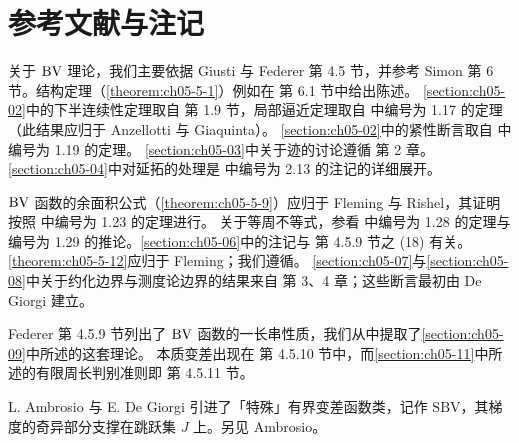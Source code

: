 \documentclass[../../main.tex]{subfiles}%
\begin{document}
\section{参考文献与注记}\label{section:ch05-12}

关于 $\mathrm{BV}$ 理论，我们主要依据 Giusti\cite{giusti1984} 与 Federer\cite{federer1969} 第 4.5 节，并参考 Simon\cite{simon1984} 第 6 节。结构定理（\cref{theorem:ch05-5-1}）例如在\cite{simon1984} 第 6.1 节中给出陈述。%
\cref{section:ch05-02}中的下半连续性定理取自\cite{giusti1984} 第 1.9 节，局部逼近定理取自\cite{giusti1984} 中编号为 1.17 的定理（此结果应归于 Anzellotti 与 Giaquinta）。%
\cref{section:ch05-02}中的紧性断言取自\cite{giusti1984} 中编号为 1.19 的定理。%
\cref{section:ch05-03}中关于迹的讨论遵循\cite{giusti1984} 第 2 章。%
\cref{section:ch05-04}中对延拓的处理是\cite{giusti1984} 中编号为 2.13 的注记的详细展开。%

$\mathrm{BV}$ 函数的余面积公式（\cref{theorem:ch05-5-9}）应归于 Fleming 与 Rishel\cite{fleming1960}，其证明按照\cite{giusti1984} 中编号为 1.23 的定理进行。%
关于等周不等式，参看\cite{giusti1984} 中编号为 1.28 的定理与编号为 1.29 的推论。\cref{section:ch05-06}中的注记与\cite{federer1969} 第 4.5.9 节之 (18) 有关。%
\cref{theorem:ch05-5-12}应归于 Fleming；我们遵循\cite{federer1972}。%
\cref{section:ch05-07}与\cref{section:ch05-08}中关于约化边界与测度论边界的结果来自\cite{giusti1984} 第 3、4 章；这些断言最初由 De Giorgi 建立。%

Federer\cite{federer1969} 第 4.5.9 节列出了 $\mathrm{BV}$ 函数的一长串性质，我们从中提取了\cref{section:ch05-09}中所述的这套理论。%
本质变差出现在\cite{federer1969} 第 4.5.10 节中，而\cref{section:ch05-11}中所述的有限周长判别准则即\cite{federer1969} 第 4.5.11 节。%

L. Ambrosio 与 E. De Giorgi\cite{ambrosio1988} 引进了「特殊」有界变差函数类，记作 $\mathrm{SBV}$，其梯度的奇异部分支撑在跳跃集 $J$ 上。另见 Ambrosio\cite{ambrosio1995}。
\end{document}
